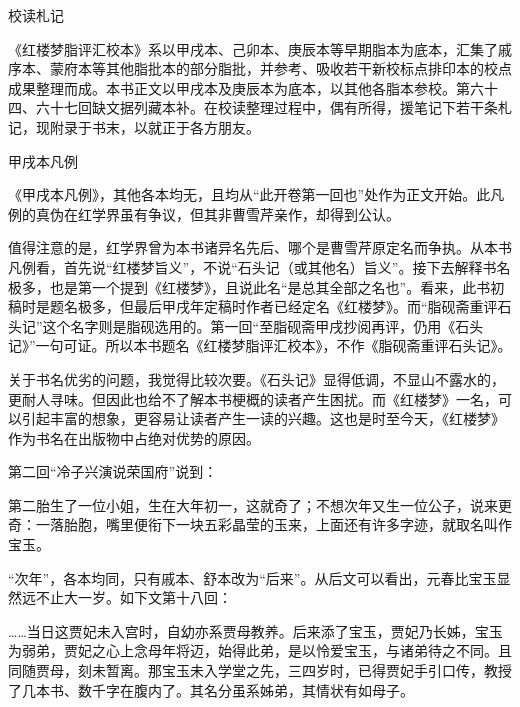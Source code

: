\newpage

\begin{center}
	{\Huge \heiti 校读札记}
\end{center}



《红楼梦脂评汇校本》系以甲戌本、己卯本、庚辰本等早期脂本为底本，汇集了戚序本、蒙府本等其他脂批本的部分脂批，并参考、吸收若干新校标点排印本的校点成果整理而成。本书正文以甲戌本及庚辰本为底本，以其他各脂本参校。第六十四、六十七回缺文据列藏本补。在校读整理过程中，偶有所得，援笔记下若干条札记，现附录于书末，以就正于各方朋友。

{\begin{center}
	\kaishu \LARGE 	甲戌本凡例
\end{center}}

《甲戌本凡例》，其他各本均无，且均从“此开卷第一回也”处作为正文开始。此凡例的真伪在红学界虽有争议，但其非曹雪芹亲作，却得到公认。

值得注意的是，红学界曾为本书诸异名先后、哪个是曹雪芹原定名而争执。从本书凡例看，首先说“红楼梦旨义”，不说“石头记（或其他名）旨义”。接下去解释书名极多，也是第一个提到《红楼梦》，且说此名“是总其全部之名也”。看来，此书初稿时是题名极多，但最后甲戌年定稿时作者已经定名《红楼梦》。而“脂砚斋重评石头记”这个名字则是脂砚选用的。第一回“至脂砚斋甲戌抄阅再评，仍用《石头记》”一句可证。所以本书题名《红楼梦脂评汇校本》，不作《脂砚斋重评石头记》。

关于书名优劣的问题，我觉得比较次要。《石头记》显得低调，不显山不露水的，更耐人寻味。但因此也给不了解本书梗概的读者产生困扰。而《红楼梦》一名，可以引起丰富的想象，更容易让读者产生一读的兴趣。这也是时至今天，《红楼梦》作为书名在出版物中占绝对优势的原因。

{{}}

第二回“冷子兴演说荣国府”说到：

第二胎生了一位小姐，生在大年初一，这就奇了；不想次年又生一位公子，说来更奇：一落胎胞，嘴里便衔下一块五彩晶莹的玉来，上面还有许多字迹，就取名叫作宝玉。

“次年”，各本均同，只有戚本、舒本改为“后来”。从后文可以看出，元春比宝玉显然远不止大一岁。如下文第十八回：

\ldots{}\ldots{}当日这贾妃未入宫时，自幼亦系贾母教养。后来添了宝玉，贾妃乃长姊，宝玉为弱弟，贾妃之心上念母年将迈，始得此弟，是以怜爱宝玉，与诸弟待之不同。且同随贾母，刻未暂离。那宝玉未入学堂之先，三四岁时，已得贾妃手引口传，教授了几本书、数千字在腹内了。其名分虽系姊弟，其情状有如母子。

